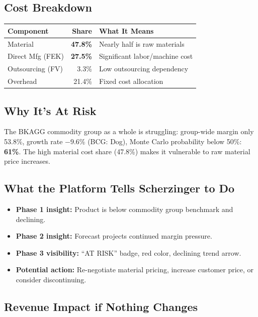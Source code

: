 \documentclass[11pt,a4paper]{article}
\begin{document}
\subsection{Cost Breakdown}

\begin{table}[H]
\centering
\begin{tabular}{lrl}
\toprule
\textbf{Component} & \textbf{Share} & \textbf{What It Means} \\
\midrule
Material               & \textbf{47.8\%} & Nearly half is raw materials \\
Direct Mfg (FEK)       & \textbf{27.5\%} & Significant labor/machine cost \\
Outsourcing (FV)       & 3.3\%            & Low outsourcing dependency \\
Overhead               & 21.4\%           & Fixed cost allocation \\
\bottomrule
\end{tabular}
\end{table}

\subsection{Why It's At Risk}

The BKAGG commodity group as a whole is struggling: group-wide margin only 53.8\%, growth rate $-$9.6\% (BCG: Dog), Monte Carlo probability below 50\%: \textbf{61\%}. The high material cost share (47.8\%) makes it vulnerable to raw material price increases.

\subsection{What the Platform Tells Scherzinger to Do}

\begin{itemize}[nosep]
  \item \textbf{Phase 1 insight:} Product is below commodity group benchmark and declining.
  \item \textbf{Phase 2 insight:} Forecast projects continued margin pressure.
  \item \textbf{Phase 3 visibility:} ``AT RISK'' badge, red color, declining trend arrow.
  \item \textbf{Potential action:} Re-negotiate material pricing, increase customer price, or consider discontinuing.
\end{itemize}

\subsection{Revenue Impact if Nothing Changes}
\end{document}
